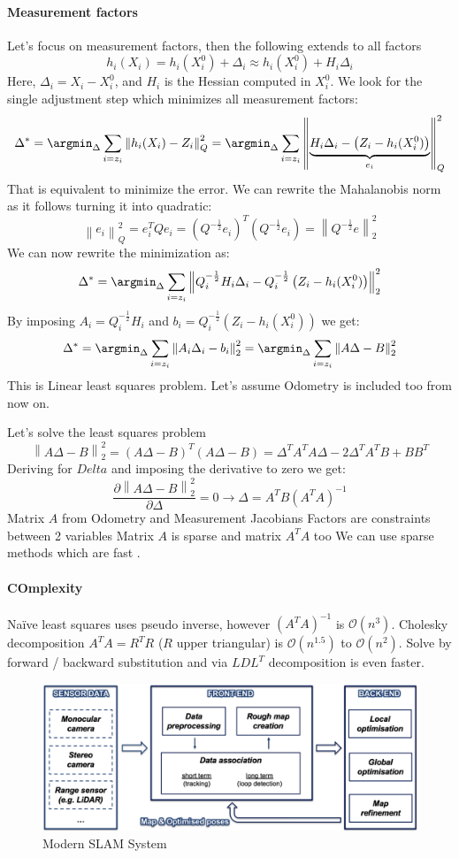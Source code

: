 \paragraph*{Measurement factors}
Let’s focus on measurement factors, then the following extends to all factors
\[h_i(X_i)=h_i(X_i^0)+\Delta_i\approx h_i(X_i^0)+H_i\Delta_i\]
Here, $\Delta_i=X_i-X_i^0$, and $H_i$ is the Hessian computed in $X_i^0$. 
We look for the single adjustment step which minimizes all measurement factors:
\[\Delta^\ast=\argmin_{\Delta}\sum_{i=z_i}\left\lVert h_i(X_i)-Z_i\right\rVert _Q^2=\argmin_{\Delta}\sum_{i=z_i}\left\lVert \underbrace{H_i\Delta_i-\left(Z_i-h_i(X_i^0)\right)}_{e_i} \right\rVert _Q^2\]
That is equivalent to minimize the error. 
We can rewrite the Mahalanobis norm as it follows turning it into quadratic:
\[\left\lVert e_i \right\rVert _Q^2=e_i^TQe_i=\left(Q^{-\frac{1}{2}}e_i\right)^T\left(Q^{-\frac{1}{2}}e_i\right)=\left\lVert Q^{-\frac{1}{2}}e \right\rVert _2^2\]
We can now rewrite the minimization as: 
\[\Delta^\ast=\argmin_{\Delta}\sum_{i=z_i}\left\lVert Q_i^{-\frac{1}{2}}H_i\Delta_i-Q_i^{-\frac{1}{2}}\left(Z_i-h_i(X_i^0)\right) \right\rVert _2^2\]
By imposing $A_i=Q_i^{-\frac{1}{2}}H_i$ and $b_i=Q_i^{-\frac{1}{2}}\left(Z_i-h_i(X_i^0)\right)$ we get: 
\[\Delta^\ast=\argmin_{\Delta}\sum_{i=z_i}\left\lVert A_i\Delta_i-b_i \right\rVert _2^2=\argmin_{\Delta}\sum_{i=z_i}\left\lVert A\Delta-B \right\rVert _2^2\]
This is Linear least squares problem. 
Let's assume Odometry is included too from now on. 

Let’s solve the least squares problem
\[\left\lVert A\Delta-B \right\rVert _2^2=(A\Delta-B)^T(A\Delta-B)=\Delta^TA^TA\Delta-2\Delta^TA^TB+BB^T\]
Deriving for $Delta$ and imposing the derivative to zero we get: 
\[\dfrac{\partial\left\lVert A\Delta-B \right\rVert _2^2}{\partial\Delta}=0\rightarrow \Delta=A^TB(A^TA)^{-1}\]
Matrix $A$ from Odometry and Measurement Jacobians
Factors are constraints between 2 variables
Matrix $A$ is sparse and matrix $A^TA$ too
 We can use sparse methods which are fast . 

\paragraph*{COmplexity}
Naïve least squares uses pseudo inverse, however $(A^TA)^{-1}$ is $\mathcal{O}(n^3)$.
Cholesky decomposition $A^TA = R^TR$ ($R$ upper triangular) is $\mathcal{O}(n^{1.5})$ to $\mathcal{O}(n^2)$. 
Solve by forward / backward substitution and via $LDL^T$ decomposition is even faster.
\begin{figure}[H]
    \centering
    \includegraphics[width=0.75\linewidth]{images/graph.png}
    \caption{Modern SLAM System}
\end{figure}
